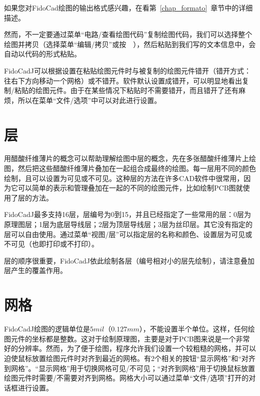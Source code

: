 \documentclass[10pt,a4paper,twoside]{scrreprt}
\newcommand{\keyevidence}[1]{\fbox{#1}}
\begin{document}
如果您对FidoCad绘图的输出格式感兴趣，在看第~\ref{chap_formato}~章节中的详细描述。

然而，不一定要通过菜单{}“电路/查看绘图代码”复制绘图代码，我们可以选择整个绘图并拷贝（选择菜单“编辑/拷贝”或按~\keyevidence{Ctrl+C}~），然后粘贴到我们写的文本信息中，会自动以代码的形式粘贴。

FidoCadJ可以根据设置在粘贴绘图元件时与被复制的绘图元件错开（错开方式：往右下方向移动一个网格）或不错开。软件默认设置成错开，可以明显地看出复制/粘贴的绘图元件。由于在某些情况下粘贴时不需要错开，而且错开了还有麻烦，所以在菜单“文件/选项”中可以对此进行设置。

\section{层} %

\label{sec_layer} 
用醋酸纤维薄片的概念可以帮助理解绘图中层的概念，先在多张醋酸纤维薄片上绘图，然后把这些醋酸纤维薄片叠加在一起组合成最终的绘图。每一层用不同的颜色绘制，且可以设置为可见或不可见。这种层的方法在许多CAD软件中很常用，因为它可以简单的表示和管理叠加在一起的不同的绘图元件，比如绘制PCB图就使用了层的方法。

FidoCadJ最多支持16层，层编号为0到15，并且已经指定了一些常用的层：0层为原理图层；1层为底层导线层；2层为顶层导线层；3层为丝印层。其它没有指定的层可以自由使用。通过菜单{}“视图/层”可以指定层的名称和颜色、设置层为可见或不可见（也即打印或不打印）。

层的顺序很重要，FidoCadJ依此绘制各层（编号相对小的层先绘制），请注意叠加层产生的覆盖作用。

\section{网格} %

FidoCadJ绘图的逻辑单位是$5mil$（$0.127mm$），不能设置半个单位。这样，任何绘图元件的坐标都是整数。这对于绘制原理图，主要是对于PCB图来说是一个非常好的分辨率。然而，为了便于绘图，程序允许我们设置一个较粗糙的网格，并可以迫使鼠标放置绘图元件时对齐到最近的网格。有2个相关的按钮{}“显示网格”和{}“对齐到网格”。“显示网格”用于切换网格可见/不可见；“对齐到网格”用于切换鼠标放置绘图元件时需要/不需要对齐到网格。网格大小可以通过菜单“文件/选项”打开的对话框进行设置。
\end{document}
